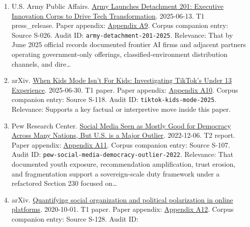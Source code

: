 \documentclass[
  american,
  11pt,
  letterpaper,
]{article}
\begin{document}
\begin{enumerate}
  \texttt{anthropic-claude-gov-2025}. Relevance: That by June 6, 2025
  Anthropic had publicly launched a government-specific model line for
  U.S. national security customers.
\item
  U.S. Army Public Affairs.
  \href{https://www.army.mil/article/286317/army_launches_detachment_201_executive_innovation_corps_to_drive_tech_transformation}{Army
  Launches Detachment 201: Executive Innovation Corps to Drive Tech
  Transformation}. 2025-06-13. T1 press\_release. Paper appendix:
  \hyperref[appendix-a9-army-launches-detachment-201-executive-innovation-corps-to-drive-tech-transformation]{Appendix
  A9}. Corpus companion entry: Source S-026. Audit ID:
  \texttt{army-detachment-201-2025}. Relevance: That by June 2025
  official records documented frontier AI firms and adjacent partners
  operating government-only offerings, classified-environment
  distribution channels, and dire\ldots{}
\item
  arXiv. \href{https://arxiv.org/abs/2507.00299}{When Kids Mode Isn't
  For Kids: Investigating TikTok's Under 13 Experience}. 2025-06-30. T1
  paper. Paper appendix:
  \hyperref[appendix-a10-when-kids-mode-isn-t-for-kids-investigating-tiktok-s-under-13-experience]{Appendix
  A10}. Corpus companion entry: Source S-118. Audit ID:
  \texttt{tiktok-kids-mode-2025}. Relevance: Supports a key factual or
  interpretive move inside this paper.
\item
  Pew Research Center.
  \href{https://www.pewresearch.org/global/2022/12/06/social-media-seen-as-mostly-good-for-democracy-across-many-nations-but-u-s-is-a-major-outlier/}{Social
  Media Seen as Mostly Good for Democracy Across Many Nations, But U.S.
  is a Major Outlier}. 2022-12-06. T2 report. Paper appendix:
  \hyperref[appendix-a11-social-media-seen-as-mostly-good-for-democracy-across-many-nations-but-u-s-is-a-major-outlier]{Appendix
  A11}. Corpus companion entry: Source S-107. Audit ID:
  \texttt{pew-social-media-democracy-outlier-2022}. Relevance: That
  documented youth exposure, recommendation amplification, trust
  erosion, and fragmentation support a sovereign-scale duty framework
  under a refactored Section 230 focused on\ldots{}
\item
  arXiv. \href{https://arxiv.org/abs/2010.00590}{Quantifying social
  organization and political polarization in online platforms}.
  2020-10-01. T1 paper. Paper appendix:
  \hyperref[appendix-a12-quantifying-social-organization-and-political-polarization-in-online-platforms]{Appendix
  A12}. Corpus companion entry: Source S-128. Audit ID:

\end{enumerate}
\end{document}
